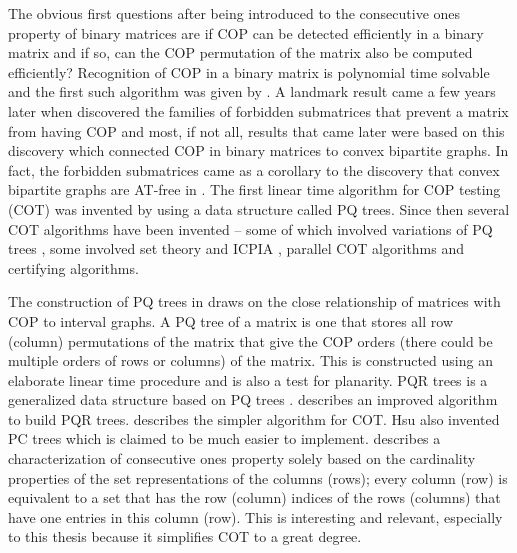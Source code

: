 \documentclass[MS,synopsis]{iitmdiss}
\begin{document}
The obvious first questions after being introduced to the consecutive
ones property of binary matrices are if COP can be detected
efficiently in a binary matrix and if so, can the COP permutation of
the matrix also be computed efficiently?  Recognition of COP in a
binary matrix is polynomial time solvable and the first such algorithm
was given by \cite{fg65}.  A landmark result came a few years later
when \cite{at72} discovered the families of forbidden submatrices that
prevent a matrix from having COP and most, if not all, results that
came later were based on this discovery which connected COP in binary
matrices to convex bipartite graphs. In fact, the forbidden
submatrices came as a corollary to the discovery that convex bipartite
graphs are AT-free in \cite{at72}. The first linear time
algorithm for COP testing (COT) was invented by \cite{bl76} using a
data structure called PQ trees.  Since then several COT algorithms
have been invented -- some of which involved variations of PQ trees
\cite{mm96,wlh01,mcc04}, some involved set theory and ICPIA
\cite{wlh02,nsnrs09}, parallel COT algorithms\cite{as95,bs03,ly91} and
certifying algorithms\cite{mcc04}. %

The construction of PQ trees in \cite{bl76} draws on the
close relationship of matrices with COP to interval graphs. A PQ tree of a
matrix is one that stores all row (column) permutations of the matrix
that give the COP orders (there could be multiple orders of rows or columns) of the matrix. This
is constructed using an elaborate linear time procedure and is also
a test for planarity. %
PQR trees is a generalized data structure based on PQ trees
\cite{mm96,mpt98}.  \cite{tm05} describes an improved algorithm to
build PQR trees. \cite{wlh02}
describes the simpler algorithm for COT. Hsu also invented PC trees
\cite{wlh01}
which is claimed to be much easier to implement. \cite{nsnrs09}
describes a characterization of consecutive ones property solely based
on the cardinality properties of the set representations of the
columns (rows); every column (row) is equivalent to a set that has the
row (column) indices of the rows (columns) that have one entries in
this column (row). This is interesting and relevant, especially to
this thesis because it simplifies COT to a great
degree. 
\end{document}
